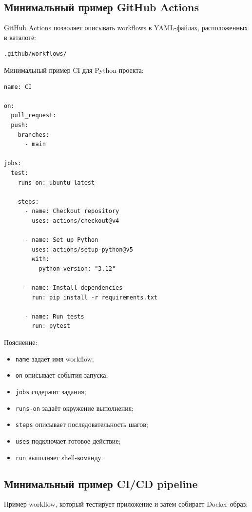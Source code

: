 \documentclass[12pt,a4paper]{article}
\begin{document}
\subsection{Минимальный пример GitHub Actions}

GitHub Actions позволяет описывать workflows в YAML-файлах, расположенных в каталоге:

\begin{lstlisting}
.github/workflows/
\end{lstlisting}

Минимальный пример CI для Python-проекта:

\begin{lstlisting}
name: CI

on:
  pull_request:
  push:
    branches:
      - main

jobs:
  test:
    runs-on: ubuntu-latest

    steps:
      - name: Checkout repository
        uses: actions/checkout@v4

      - name: Set up Python
        uses: actions/setup-python@v5
        with:
          python-version: "3.12"

      - name: Install dependencies
        run: pip install -r requirements.txt

      - name: Run tests
        run: pytest
\end{lstlisting}

Пояснение:

\begin{itemize}
    \item \texttt{name} задаёт имя workflow;
    \item \texttt{on} описывает события запуска;
    \item \texttt{jobs} содержит задания;
    \item \texttt{runs-on} задаёт окружение выполнения;
    \item \texttt{steps} описывает последовательность шагов;
    \item \texttt{uses} подключает готовое действие;
    \item \texttt{run} выполняет shell-команду.
\end{itemize}

\subsection{Минимальный пример CI/CD pipeline}

Пример workflow, который тестирует приложение и затем собирает Docker-образ:
\end{document}
